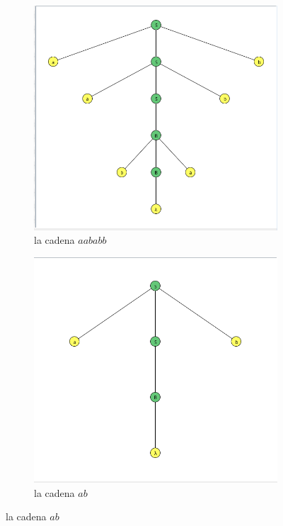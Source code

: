 \documentclass{article}
\begin{document}
\begin{flushleft}
\begin{enumerate}
\begin{figure}[h]
\begin{subfigure}[b]{0.45\textwidth}
                        \includegraphics[width=\textwidth]{./Imagenes/grafo1.png}
                        \caption{la cadena $aababb$}
                        \label{fig:label7}
                    \end{subfigure}
                    \hfill
                    \begin{subfigure}[b]{0.45\textwidth}
                        \centering
                        \includegraphics[width=\textwidth]{./Imagenes/grafo2.png}
                        \caption{la cadena $ab$}
                        \label{fig:label8}
                    \end{subfigure}
                    \label{fig:matrix2}
                \end{figure}

            \end{enumerate}
        \end{flushleft}
        
\end{document}

